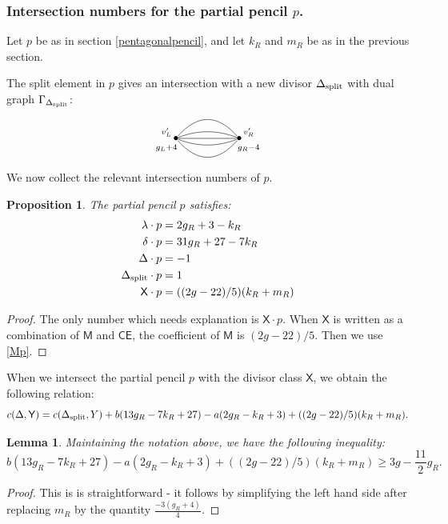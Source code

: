 \documentclass[reqno, 10 pt]{article}
\newtheorem{lem}[thm]{Lemma}
\newtheorem{prop}[thm]{Proposition}
\theoremstyle{definition}
\theoremstyle{remark}
\numberwithin{equation}{section}
\numberwithin{thm}{section}
\numberwithin{prop}{section}
\numberwithin{lem}{section}
\numberwithin{cor}{section}
\numberwithin{conj}{section}
\numberwithin{defn}{section}
\newcommand{\sfY}{{\mathsf Y}}
\newcommand{\sfX}{{\mathsf X}}
\newcommand{\sfCE}{{\mathsf {CE}}}
\newcommand{\sfM}{{\mathsf M}}
\newcommand {\spl}{{\rm split}}
\begin{document}
\subsubsection{Intersection numbers for the partial pencil $p$.}
Let $p$ be as in section \ref{pentagonalpencil}, and let $k_R$ and $m_{R}$ be as in the previous section. 

The split element in $p$ gives an intersection with a new divisor $\Delta_{\spl}$ with dual graph $\Gamma_{\Delta_{\spl}}$:

\[  \xygraph{
!{<0cm,0cm>;<1cm,0cm>:<0cm,1cm>::}
!{(0,0) }*{\bullet}="l"!{(-.3,.2)}{\scriptstyle v'_L}!{(-.3,-.3)}{\scriptstyle g_L+4}
!{(2,0) }*{\bullet}="r"!{(2.3,.2)}{\scriptstyle v'_R}!{(2.3,-.3)}{\scriptstyle g_R-4}
 "l"-@/^.6cm/"r"  
"l"-@/^/"r" 
"l"-"r"
"l"-@/_/"r"
"l"-@/_.6cm/"r" 
}  \]

We now collect the relevant intersection numbers of $p$. 
\begin{prop}\label{pentagonalpencilnumbers}
The partial pencil $p$ satisfies: 
\begin{align*}
\lambda \cdot p &= 2g_{R} + 3 -  k_{R}\\
\delta \cdot p &= 31g_{R} + 27 - 7k_{R} \\
\Delta \cdot p &= -1\\
\Delta_{\spl} \cdot p &= 1\\
\sfX \cdot p &= ((2g-22)/5)(k_{R} + m_{R})
\end{align*}
\end{prop}
\begin{proof}
The only number which needs explanation is $\sfX \cdot p$.   When $\sfX$ is written as a combination of $\sfM$ and $\sfCE$, the coefficient of $\sfM$ is $(2g-22)/5$.  Then we use \autoref{Mp}.
\end{proof}

When we intersect the partial pencil $p$ with the divisor class $\sfX$, we obtain the following relation: 
\begin{equation}\label{pentrelation}
c(\Delta, \sfY) = c(\Delta_{\spl},Y) + b(13g_{R} -7k_{R} +27) - a(2g_{R} -k_{R} +3)  + ((2g-22)/5)(k_{R} + m_{R}).
\end{equation}

\begin{lem}\label{pos}
Maintaining the notation above, we have the following inequality: 
\begin{equation}\label{ineq}
b(13g_{R} -7k_{R} +27) - a(2g_{R} -k_{R} +3)  + ((2g-22)/5)(k_{R} + m_{R}) \geq 3g - \frac{11}{2}g_{R}.
\end{equation}
\end{lem}
\begin{proof}
This is is straightforward - it follows by simplifying the left hand side after replacing $m_{R}$ by the quantity $\frac{-3(g_{R} + 4)}{4}$.
\end{proof}
\end{document}
